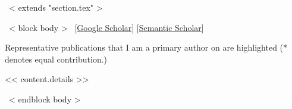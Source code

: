~< extends "section.tex" >~

~< block body >~
\vspace{-8.2mm}\hspace{30mm}[\href{https://scholar.google.com/citations?user=<< scholar_id >>}{Google Scholar}]
[\href{https://www.semanticscholar.org/author/<< semantic_id >>}{Semantic Scholar}]
\vspace{2mm}

Representative publications that I am a primary author on are
\colorbox{tab_highlight}{highlighted} (* denotes equal contribution.)



<< content.details >>

~< endblock body >~